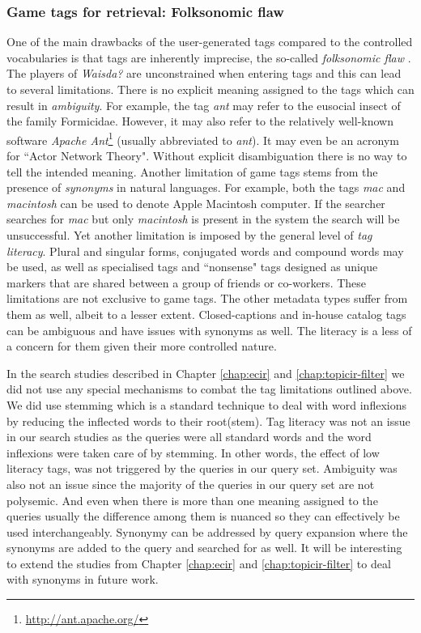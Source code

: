 \subsubsection{Game tags for retrieval: Folksonomic flaw}\label{conclusion:folsonomy-flaw}
One of the main drawbacks of the user-generated tags compared to the controlled vocabularies is that tags are inherently imprecise, the so-called \textit{folksonomic flaw} \cite{Mathes04folksonomies,citeulike:468899}. The players of \textit{Waisda?} are unconstrained when entering tags and this can lead to several limitations. There is no explicit meaning assigned to the tags which can result in \textit{ambiguity}. For example, the tag \textit{ant} may refer to the eusocial insect of the family Formicidae. However, it may also refer to the relatively well-known software \textit{Apache Ant}\footnote{\url{http://ant.apache.org/}} (usually abbreviated to \textit{ant}). It may even be an acronym for ``Actor Network Theory". Without explicit disambiguation there is no way to tell the intended meaning. Another limitation of game tags stems from the presence of \textit{synonyms} in natural languages. For example, both the tags \textit{mac} and \textit{macintosh} can be used to denote Apple Macintosh computer. If the searcher searches for \textit{mac} but only \textit{macintosh} is present in the system the search will be unsuccessful. Yet another limitation is imposed by the general level of \textit{tag literacy}. Plural and singular forms, conjugated words and compound words may be used, as well as specialised tags and ``nonsense" tags designed as unique markers that are shared between a group of friends or co-workers. These limitations are not exclusive to game tags. The other metadata types suffer from them as well, albeit to a lesser extent. Closed-captions and in-house catalog tags can be ambiguous and have issues with synonyms as well. The literacy is a less of a concern for them given their more controlled nature. 

In the search studies described in Chapter \ref{chap:ecir} and \ref{chap:topicir-filter} we did not use any special mechanisms to combat the tag limitations outlined above. We did use stemming which is a standard technique to deal with word inflexions by reducing the inflected words to their root(stem). Tag literacy was not an issue in our search studies as the queries were all standard words and the word inflexions were taken care of by stemming. In other words, the effect of low literacy tags, was not triggered by the queries in our query set. Ambiguity was also not an issue since the majority of the queries in our query set are not polysemic. And even when there is more than one meaning assigned to the queries usually the difference among them is nuanced so they can effectively be used interchangeably. Synonymy can be addressed by query expansion where the synonyms are added to the query and searched for as well. It will be interesting to extend the studies from Chapter \ref{chap:ecir} and \ref{chap:topicir-filter} to deal with synonyms in future work.

